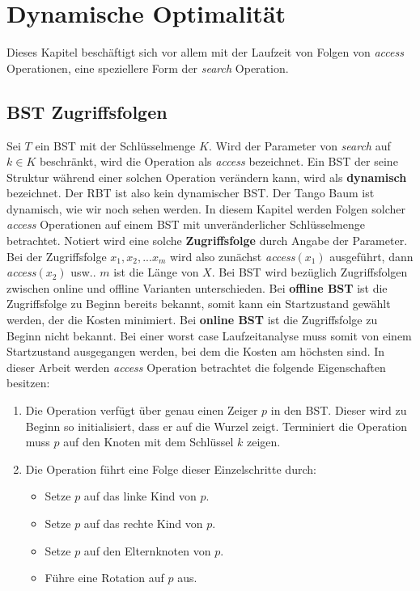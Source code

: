 \documentclass[a4paper,12pt]{article}
\begin{document}
\section{Dynamische Optimalität}
Dieses Kapitel beschäftigt sich vor allem mit der Laufzeit von Folgen von \textit{access} Operationen, eine speziellere Form der \textit{search} Operation.  
\subsection{BST Zugriffsfolgen}
Sei $T$ ein BST mit der Schlüsselmenge $K$. Wird der Parameter von \textit{search} auf $k \in K $ beschränkt, wird  die Operation als \textit{access} bezeichnet. Ein BST der seine Struktur während einer solchen Operation verändern kann, wird als \textbf{dynamisch} bezeichnet. Der RBT ist also kein dynamischer BST. Der Tango Baum ist dynamisch, wie wir noch sehen werden. In diesem Kapitel werden Folgen solcher \textit{access} Operationen auf einem BST mit unveränderlicher Schlüsselmenge betrachtet. Notiert wird eine solche \textbf{Zugriffsfolge} durch Angabe der Parameter. Bei der Zugriffsfolge $x_1,x_2,...x_m$ wird also zunächst \textit{access}$(x_1)$ ausgeführt, dann \textit{access}$(x_2)$ usw.. $m$ ist die Länge von $X$. Bei BST wird bezüglich Zugriffsfolgen zwischen online und offline Varianten unterschieden. Bei \textbf{offline BST} ist die Zugriffsfolge zu Beginn bereits bekannt, somit kann ein Startzustand gewählt werden, der die Kosten minimiert. Bei \textbf{online BST} ist die Zugriffsfolge zu Beginn nicht bekannt. Bei einer worst case Laufzeitanalyse muss somit von einem Startzustand ausgegangen werden, bei dem die Kosten am höchsten sind.
In dieser Arbeit werden \textit{access} Operation betrachtet die folgende Eigenschaften besitzen:

\begin{enumerate} 
	\item Die Operation verfügt über genau einen Zeiger $p$ in den BST. Dieser wird zu Beginn so initialisiert, dass er auf die Wurzel zeigt. Terminiert die Operation muss $p$ auf den Knoten mit dem Schlüssel $k$ zeigen.
	\item Die Operation führt eine Folge dieser Einzelschritte durch:
	\begin{itemize}
		\item Setze $p$ auf das linke Kind von $p$.
		\item Setze $p$ auf das rechte Kind von $p$.
		\item Setze $p$ auf den Elternknoten von $p$.
		\item Führe eine Rotation auf $p$ aus.
	\end{itemize}  
	
\end{enumerate}
\end{document}
